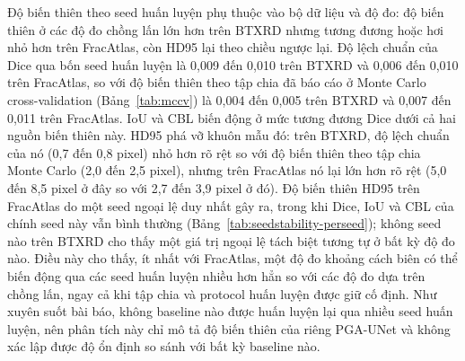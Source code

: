 \documentclass[11pt]{article}
\begin{document}
Độ biến thiên theo seed huấn luyện phụ thuộc vào bộ dữ liệu và độ đo: độ biến thiên ở các độ đo chồng lấn lớn hơn trên BTXRD nhưng tương đương hoặc hơi nhỏ hơn trên FracAtlas, còn HD95 lại theo chiều ngược lại. Độ lệch chuẩn của Dice qua bốn seed huấn luyện là 0,009 đến 0,010 trên BTXRD và 0,006 đến 0,010 trên FracAtlas, so với độ biến thiên theo tập chia đã báo cáo ở Monte Carlo cross-validation (Bảng~\ref{tab:mccv}) là 0,004 đến 0,005 trên BTXRD và 0,007 đến 0,011 trên FracAtlas. IoU và CBL biến động ở mức tương đương Dice dưới cả hai nguồn biến thiên này. HD95 phá vỡ khuôn mẫu đó: trên BTXRD, độ lệch chuẩn của nó (0,7 đến 0,8 pixel) nhỏ hơn rõ rệt so với độ biến thiên theo tập chia Monte Carlo (2,0 đến 2,5 pixel), nhưng trên FracAtlas nó lại lớn hơn rõ rệt (5,0 đến 8,5 pixel ở đây so với 2,7 đến 3,9 pixel ở đó). Độ biến thiên HD95 trên FracAtlas do một seed ngoại lệ duy nhất gây ra, trong khi Dice, IoU và CBL của chính seed này vẫn bình thường (Bảng~\ref{tab:seedstability-perseed}); không seed nào trên BTXRD cho thấy một giá trị ngoại lệ tách biệt tương tự ở bất kỳ độ đo nào. Điều này cho thấy, ít nhất với FracAtlas, một độ đo khoảng cách biên có thể biến động qua các seed huấn luyện nhiều hơn hẳn so với các độ đo dựa trên chồng lấn, ngay cả khi tập chia và protocol huấn luyện được giữ cố định. Như xuyên suốt bài báo, không baseline nào được huấn luyện lại qua nhiều seed huấn luyện, nên phân tích này chỉ mô tả độ biến thiên của riêng PGA-UNet và không xác lập được độ ổn định so sánh với bất kỳ baseline nào.

\begin{table}[H]
\caption{Số liệu từng seed làm nền cho trung bình $\pm$ độ lệch chuẩn ở Bảng~\ref{tab:seedstability}, ở $512\times512$ trên tập chia cố định gốc, bốn seed huấn luyện (z: bao phủ, s: lệch tâm).}
\label{tab:seedstability-perseed}
\centering
\scriptsize
{}
\end{table}
\end{document}
